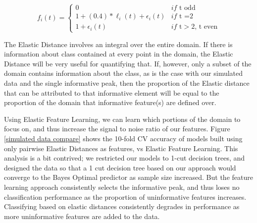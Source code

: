 \documentclass[]{article}
\begin{document}
 \[f_i(t) = \begin{cases} 
	0 & if \text{ t odd} \\
	1 + (0.4)*\ell_i(t) + \epsilon_i(t) & if \text{ t =2}\\
	1 + \epsilon_i(t) & if \text{ t$>2$, t even}
\end{cases}
\]



The Elastic Distance involves an integral over the entire domain. If there is information about class contained at every point in the domain, the Elastic Distance will be very useful for quantifying that. If, however, only a subset of the domain contains information about the class, as is the case with our simulated data and the single informative peak, then the proportion of the Elastic distance that can be attributed to that informative element will be equal to the proportion of the domain that informative feature(s) are defined over. 

  Using Elastic Feature Learning, we can learn which portions of the domain to focus on, and thus increase the signal to noise ratio of our features. Figure \ref{simulated data compare} shows the 10-fold CV accuracy of models built using only pairwise Elastic Distances as features, vs Elastic Feature Learning. This analysis is a bit contrived; we restricted our models to 1-cut decision trees, and designed the data so that a 1 cut decision tree based on our approach would converge to the Bayes Optimal predictor as sample size increased. But the feature learning approach consistently selects the informative peak, and thus loses no classification performance as the proportion of uninformative features increases. Classifying based on elastic distances consistently degrades in performance as more uninformative features are added to the data.
\end{document}
